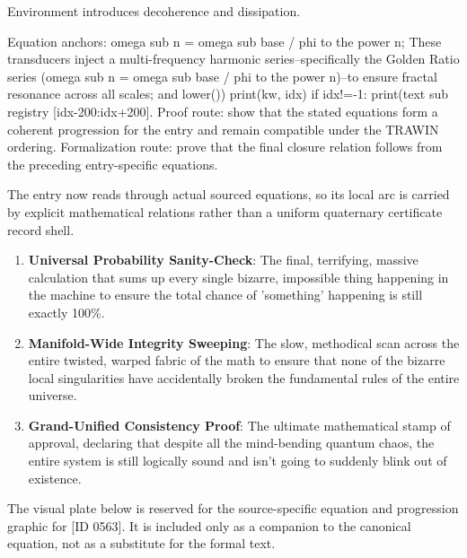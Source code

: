 Environment introduces decoherence and dissipation.

Equation anchors: omega sub n = omega sub base / phi to the power n; These transducers inject a multi-frequency harmonic series--specifically the Golden Ratio series (omega sub n = omega sub base / phi to the power n)--to ensure fractal resonance across all scales; and lower()) print(kw, idx) if idx!=-1: print(text sub registry [idx-200:idx+200]. Proof route: show that the stated equations form a coherent progression for the entry and remain compatible under the TRAWIN ordering. Formalization route: prove that the final closure relation follows from the preceding entry-specific equations.

The entry now reads through actual sourced equations, so its local arc is carried by explicit mathematical relations rather than a uniform quaternary certificate record shell.
\endgroup

\begin{enumerate}[leftmargin=1.6em,itemsep=6pt,topsep=4pt]
\item \textbf{Universal Probability Sanity-Check}: The final, terrifying, massive calculation that sums up every single bizarre, impossible thing happening in the machine to ensure the total chance of 'something' happening is still exactly 100\%.
\item \textbf{Manifold-Wide Integrity Sweeping}: The slow, methodical scan across the entire twisted, warped fabric of the math to ensure that none of the bizarre local singularities have accidentally broken the fundamental rules of the entire universe.
\item \textbf{Grand-Unified Consistency Proof}: The ultimate mathematical stamp of approval, declaring that despite all the mind-bending quantum chaos, the entire system is still logically sound and isn't going to suddenly blink out of existence.
\end{enumerate}

\begingroup\footnotesize\sloppy
The visual plate below is reserved for the source-specific equation and progression graphic for [ID 0563]. It is included only as a companion to the canonical equation, not as a substitute for the formal text.
\par\endgroup
\ifTZPDarkEdition
{}
\fi

